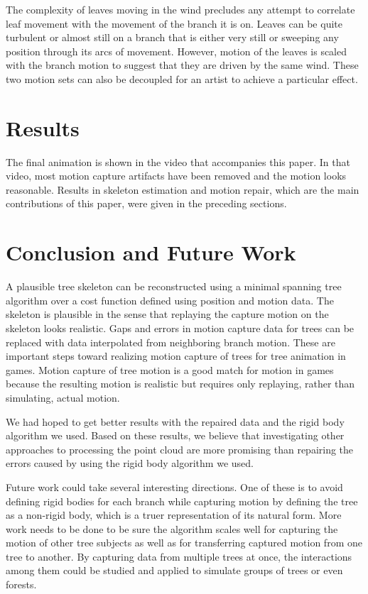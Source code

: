 The complexity of leaves moving in the wind precludes any attempt to correlate leaf movement with the movement of the branch it is on. Leaves can be quite turbulent or almost still on a branch that is either very still or sweeping any position through its arcs of movement. However, motion of the leaves is scaled with the branch motion to suggest that they are driven by the same wind. These two motion sets can also be decoupled for an artist to achieve a particular effect. 

% 
\section{Results} 

The final animation is shown in the video that accompanies this paper. In that video, most motion capture artifacts have been removed and the motion looks reasonable.  Results in skeleton estimation and motion repair, which are the main contributions of this paper, were given in the preceding sections.

% 
\section{Conclusion and Future Work} 

A plausible tree skeleton can be reconstructed using a minimal spanning tree algorithm over a cost function defined using position and motion data.  The skeleton is plausible in the sense that replaying the capture motion on the skeleton looks realistic.  Gaps and errors in motion capture data for trees can be replaced with data interpolated from neighboring branch motion.  These are important steps toward realizing motion capture of trees for tree animation in games.  Motion capture of tree motion is a good match for motion in games because the resulting motion is realistic but requires only replaying, rather than simulating, actual motion.  

We had hoped to get better results with the repaired data and the rigid body algorithm we used. Based on these results, we believe that investigating other approaches to processing the point cloud are more promising than repairing the errors caused by using the rigid body algorithm we used.  

Future work could take several interesting directions. One of these is to avoid defining rigid bodies for each branch while capturing motion by defining the tree as a non-rigid body, which is a truer representation of its natural form. More work needs to be done to be sure the algorithm scales well for capturing the motion of other tree subjects as well as for transferring captured motion from one tree to another. By capturing data from multiple trees at once, the interactions among them could be studied and applied to simulate groups of trees or even forests.